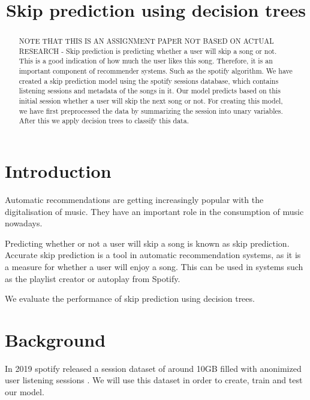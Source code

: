 \documentclass[conference]{IEEEtran}
\begin{document}
\title{Skip prediction using decision trees\\}

\author{
}

\maketitle

\begin{abstract}
	NOTE THAT THIS IS AN ASSIGNMENT PAPER NOT BASED ON ACTUAL RESEARCH - 
	Skip prediction is predicting whether a user will skip a song or not. 
	This is a good indication of how much the user likes this song.
	Therefore, it is an important component of recommender systems. Such as the spotify algorithm. 
	We have created a skip prediction model using the spotify sessions database, 
	which contains listening sessions and metadata of the songs in it. 
	Our model predicts based on this initial session whether a user will skip the next song or not.
	For creating this model, we have first preprocessed the data by summarizing the session into unary variables. 
	After this we apply decision trees to classify this data.
\end{abstract}

\section{Introduction}
Automatic recommendations are getting increasingly popular with the digitalisation of music. They have an important role in the consumption of music nowadays. 

Predicting whether or not a user will skip a song is known as skip prediction. 
Accurate skip prediction is a tool in automatic recommendation systems, as it is
a measure for whether a user will enjoy a song\cite{b1}. 
This can be used in systems such as the playlist creator or autoplay from Spotify. 

We evaluate the performance of skip prediction using decision trees.

\section{Background}
In 2019 spotify released a session dataset of around 10GB filled with anonimized user listening sessions \cite{b2}. We will use this dataset in order to create, train and test our model. 
\end{document}
